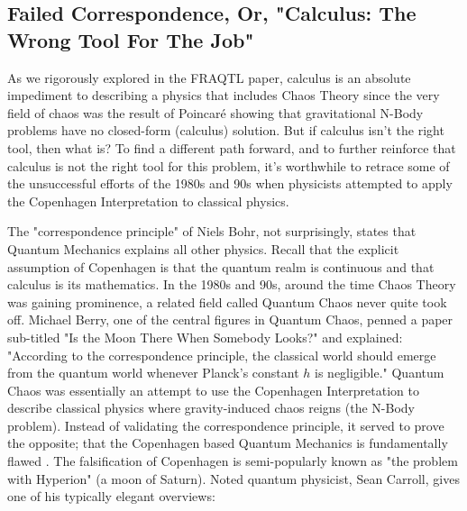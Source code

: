 \documentclass{article}
\begin{document}
\subsection*{Failed Correspondence, Or, "Calculus: The Wrong Tool For The Job"}
As we rigorously explored in the FRAQTL paper, calculus is an absolute impediment to describing a physics that includes Chaos Theory\cite{FRAQTL2024} since the very field of chaos was the result of Poincar\'e showing that gravitational N-Body problems have no closed-form (calculus) solution. But if calculus isn't the right tool, then what is? To find a different path forward, and to further reinforce that calculus is not the right tool for this problem, it's worthwhile to retrace some of the unsuccessful efforts of the 1980s and 90s when physicists attempted to apply the Copenhagen Interpretation to classical physics.

The "correspondence principle" of Niels Bohr, not surprisingly, states that Quantum Mechanics explains all other physics. Recall that the explicit assumption of Copenhagen is that the quantum realm is continuous and that calculus is its mathematics. In the 1980s and 90s, around the time Chaos Theory was gaining prominence, a related field called Quantum Chaos never quite took off. Michael Berry, one of the central figures in Quantum Chaos, penned a paper sub-titled "Is the Moon There When Somebody Looks?" and explained: "According to the correspondence principle, the classical world should emerge from the quantum world whenever Planck’s constant $h$ is negligible." Quantum Chaos was essentially an attempt to use the Copenhagen Interpretation to describe classical physics where gravity-induced chaos reigns (the N-Body problem). Instead of validating the correspondence principle, it served to prove the opposite; that the Copenhagen based Quantum Mechanics is fundamentally flawed \cite{Zurek1998}. The falsification of Copenhagen is semi-popularly known as "the problem with Hyperion" (a moon of Saturn). Noted quantum physicist, Sean Carroll, gives one of his typically elegant overviews:
\end{document}
